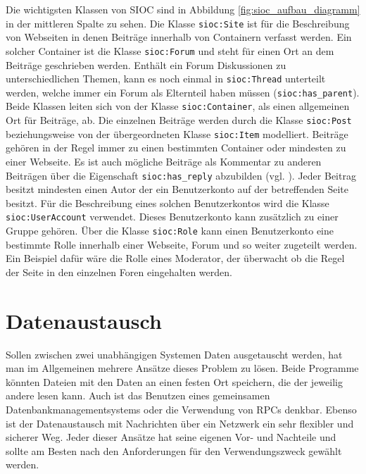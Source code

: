Die wichtigsten Klassen von SIOC sind in Abbildung \ref{fig:sioc_aufbau_diagramm} in der mittleren Spalte zu sehen. Die Klasse \texttt{sioc:Site} ist für die Beschreibung von Webseiten in denen Beiträge innerhalb von Containern verfasst werden. Ein solcher Container ist die Klasse \texttt{sioc:Forum} und steht für einen Ort an dem Beiträge geschrieben werden. Enthält ein Forum Diskussionen zu unterschiedlichen Themen, kann es noch einmal in \texttt{sioc:Thread} unterteilt werden, welche immer ein Forum als Elternteil haben müssen (\texttt{sioc:has\_parent}). Beide Klassen leiten sich von der Klasse \texttt{sioc:Container}, als einen allgemeinen Ort für Beiträge, ab. Die einzelnen Beiträge werden durch die Klasse \texttt{sioc:Post} beziehungsweise von der übergeordneten Klasse \texttt{sioc:Item} modelliert. Beiträge gehören in der Regel immer zu einen bestimmten Container oder mindesten zu einer Webseite. Es ist auch mögliche Beiträge als Kommentar zu anderen Beiträgen über die Eigenschaft \texttt{sioc:has\_reply} abzubilden (vgl. \cite[S.\,203ff]{Breslin2009}). Jeder Beitrag besitzt mindesten einen Autor der ein Benutzerkonto auf der betreffenden Seite besitzt. Für die Beschreibung eines solchen Benutzerkontos wird die Klasse \texttt{sioc:UserAccount} verwendet. Dieses Benutzerkonto kann zusätzlich zu einer Gruppe gehören. Über die Klasse \texttt{sioc:Role} kann einen Benutzerkonto eine bestimmte Rolle innerhalb einer Webseite, Forum und so weiter zugeteilt werden. Ein Beispiel dafür wäre die Rolle eines Moderator, der überwacht ob die Regel der Seite in den einzelnen Foren eingehalten werden.




\section{Datenaustausch} %
\label{sec:datenverteilung}

Sollen zwischen zwei unabhängigen Systemen Daten ausgetauscht werden, hat man im Allgemeinen mehrere Ansätze dieses Problem zu lösen. Beide Programme könnten Dateien mit den Daten an einen festen Ort speichern, die der jeweilig andere lesen kann. Auch ist das Benutzen eines gemeinsamen Datenbankmanagementsystems oder die Verwendung von RPCs denkbar. Ebenso ist der Datenaustausch mit Nachrichten über ein Netzwerk ein sehr flexibler und sicherer Weg. Jeder dieser Ansätze hat seine eigenen Vor- und Nachteile und sollte am Besten nach den Anforderungen für den Verwendungszweck gewählt werden. 

